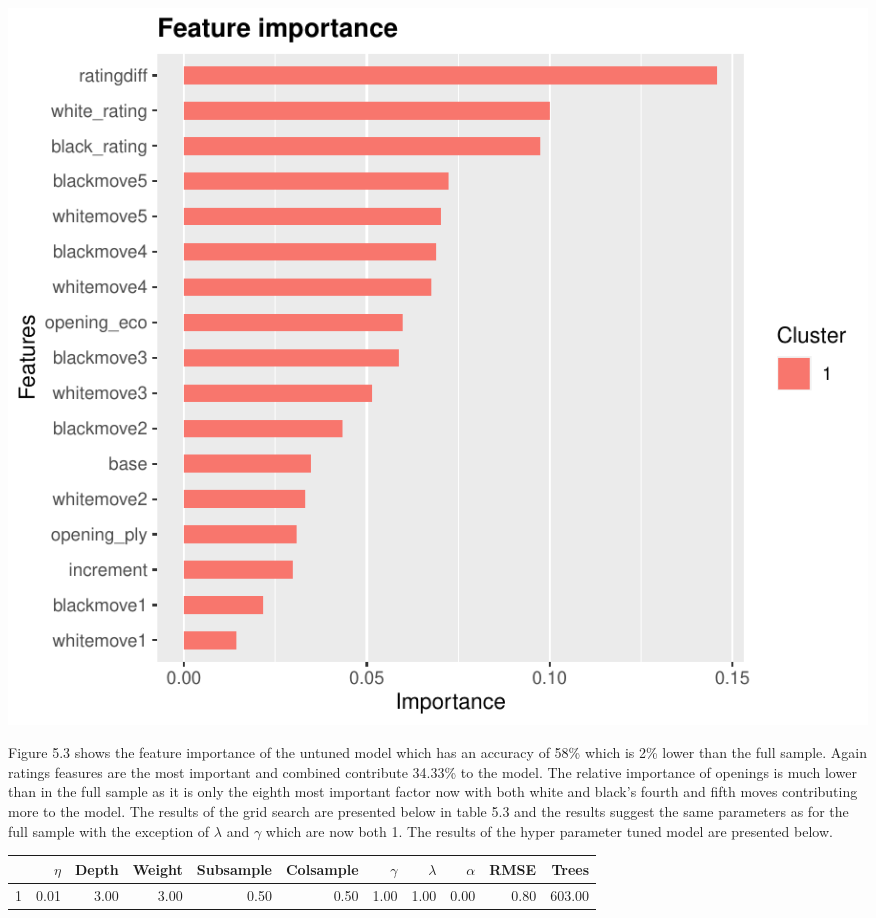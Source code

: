 \documentclass[12pt,preprint, authoryear]{elsarticle}
\let\origfigure\figure
\let\endorigfigure\endfigure
\renewenvironment{figure}[1][2] {
    \expandafter\origfigure\expandafter[H]
} {
    \endorigfigure
}
\let\origtable\table
\let\endorigtable\endtable
\renewenvironment{table}[1][2] {
    \expandafter\origtable\expandafter[H]
} {
    \endorigtable
}
\numberwithin{equation}{section}
\numberwithin{figure}{section}
\numberwithin{table}{section}
\begin{document}
\begin{figure}[H]

{\centering \includegraphics{WriteUp_files/figure-latex/importancelow1-1} 

}

\caption{Feature Importance Untuned Model: Bottom Half\label{Figure11}}\label{fig:importancelow1}
\end{figure}

Figure 5.3 shows the feature importance of the untuned model which has
an accuracy of 58\% which is 2\% lower than the full sample. Again
ratings feasures are the most important and combined contribute 34.33\%
to the model. The relative importance of openings is much lower than in
the full sample as it is only the eighth most important factor now with
both white and black's fourth and fifth moves contributing more to the
model. The results of the grid search are presented below in table 5.3
and the results suggest the same parameters as for the full sample with
the exception of \(\lambda\) and \(\gamma\) which are now both 1. The
results of the hyper parameter tuned model are presented below.

\begin{table}[H]
\centering
\begin{tabular}{rrrrrrrrrrr}
  \hline
 & $\eta$ & Depth & Weight & Subsample & Colsample& $\gamma$ & $\lambda$ & $\alpha$ & RMSE & Trees \\  
  \hline
1 & 0.01 & 3.00 & 3.00 & 0.50 & 0.50 & 1.00 & 1.00 & 0.00 & 0.80 & 603.00 \\ 

   \hline
\end{tabular}
\caption{Hypergrid Bottom Half} 
\end{table}
\end{document}
